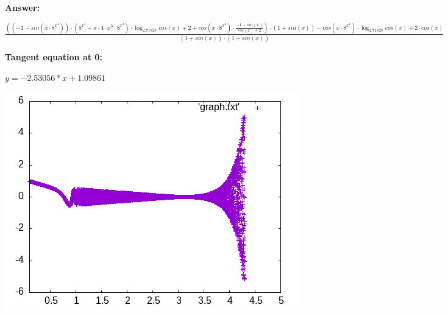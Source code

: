 \documentclass[12pt,a4paper,fleqn]{article}
\theoremstyle{definition}
\begin{document}
\textbf{Answer:}

$\frac{(( -1  - sin( x  \cdot { 8 }^{{ x }^{ 4 }})) \cdot ({ 8 }^{{ x }^{ 4 }} +  x  \cdot  4  \cdot { x }^{ 3 } \cdot { 8 }^{{ x }^{ 4 }}) \cdot \log_{ 2.71828 }{cos( x ) +  2 } + cos( x  \cdot { 8 }^{{ x }^{ 4 }}) \cdot \frac{ -1  - sin( x )}{cos( x ) +  2 }
) \cdot ( 1  + sin( x )) - cos( x  \cdot { 8 }^{{ x }^{ 4 }}) \cdot \log_{ 2.71828 }{cos( x ) +  2 } \cdot cos( x )}{( 1  + sin( x )) \cdot ( 1  + sin( x ))}
$


\textbf{Tangent equation at 0:}

$y = -2.53056 * x + 1.09861$


\includegraphics{./graph.png} 
\end{document}
